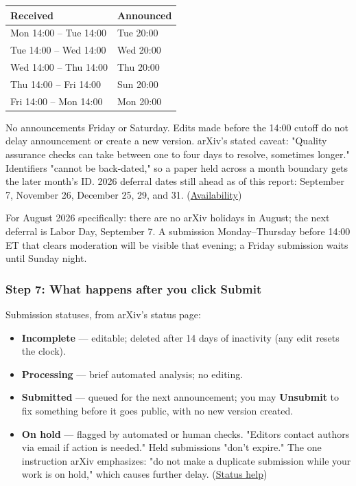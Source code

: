 \documentclass[twocolumn,10pt,letterpaper]{article}
\begin{document}
\vspace{0.4em}
\noindent
\small
\begin{tabularx}{\columnwidth}{@{}>{\raggedright\arraybackslash}X>{\raggedright\arraybackslash}X@{}}
\toprule
\textbf{Received} & \textbf{Announced} \\
\midrule
Mon 14:00 – Tue 14:00 & Tue 20:00 \\
Tue 14:00 – Wed 14:00 & Wed 20:00 \\
Wed 14:00 – Thu 14:00 & Thu 20:00 \\
Thu 14:00 – Fri 14:00 & Sun 20:00 \\
Fri 14:00 – Mon 14:00 & Mon 20:00 \\
\bottomrule
\end{tabularx}
\vspace{0.4em}

No announcements Friday or Saturday. Edits made before the 14:00 cutoff do not delay announcement or create a new version. arXiv's stated caveat: "Quality assurance checks can take between one to four days to resolve, sometimes longer." Identifiers "cannot be back-dated," so a paper held across a month boundary gets the later month's ID. 2026 deferral dates still ahead as of this report: September 7, November 26, December 25, 29, and 31. (\href{https://info.arxiv.org/help/availability.html}{Availability})


For August 2026 specifically: there are no arXiv holidays in August; the next deferral is Labor Day, September 7. A submission Monday–Thursday before 14:00 ET that clears moderation will be visible that evening; a Friday submission waits until Sunday night.


\subsubsection{Step 7: What happens after you click Submit}

Submission statuses, from arXiv's status page:


\begin{itemize}
\setlength{\itemsep}{0pt}
\setlength{\parskip}{0pt}
  \item \textbf{Incomplete} — editable; deleted after 14 days of inactivity (any edit resets the clock).
  \item \textbf{Processing} — brief automated analysis; no editing.
  \item \textbf{Submitted} — queued for the next announcement; you may \textbf{Unsubmit} to fix something before it goes public, with no new version created.
  \item \textbf{On hold} — flagged by automated or human checks. "Editors contact authors via email if action is needed." Held submissions "don't expire." The one instruction arXiv emphasizes: "do not make a duplicate submission while your work is on hold," which causes further delay. (\href{https://info.arxiv.org/help/submit\_status.html}{Status help})
\end{itemize}
\end{document}

